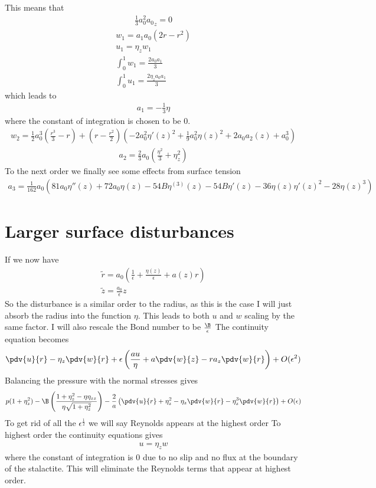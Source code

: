 \documentclass[12pt]{article}
\newcommand{\rt}{^{\frac{1}{2}}}
\begin{document}
This means that 
\begin{align}
\frac{1}{3}a_0^2{a_0}_z = 0
\end{align}
\begin{align}
w_1 = a_1 a_0 (2r - r^2) \\
u_1 = \eta_z w_1\\
\int_0^1 w_1 = \frac{2a_0 a_1}{3}\\
\int_0^1 u_1 = \frac{2\eta_za_0 a_1}{3}
\end{align}
which leads to 
\begin{align}
a_1 = -\frac{1}{3}\eta
\end{align}
where the constant of integration is chosen to be 0.
\begin{align}
w_2 = \frac{1}{2} a_0^3 \left(\frac{r^3}{3}-r\right)+\left(r-\frac{r^2}{2}\right) \left(-2
a_0^2 \eta '(z)^2+\frac{1}{9} a_0^2 \eta (z)^2+2 a_0 a_2(z)+a_0^3\right)
\end{align}
\begin{align}
a_2 = \frac{2}{3}a_0\left(\frac{\eta^2}{3}+\eta_z^2\right)\end{align}
 To the next order we finally see some effects from surface tension
 \begin{align}
 a_3 = \frac{1}{162} a_0 \left(81 a_0 \eta ''(z)+72 a_0 \eta (z)-54 B \eta
 ^{(3)}(z)-54 B \eta '(z)-36 \eta (z) \eta '(z)^2-28 \eta (z)^3\right)
 \end{align}
\section{Larger surface disturbances}
If we now have
\begin{align}
\tilde{r} = a_0\left(\frac{1}{\epsilon}+\frac{\eta(z)}{\epsilon}+a(z) r\right)\\
\tilde{z} = \frac{a_0}{\epsilon}z
\end{align}
So the disturbance is a similar order to the radius, as this is the case I will just absorb the radius into the function $\eta$. This leads to both $u$ and $w$ scaling by the same factor. I will also rescale the Bond number to be $\frac{\B}{\epsilon}$ The continuity equation becomes 
\begin{align}
\pdv{u}{r}-\eta_z\pdv{w}{r}+\epsilon\left(\frac{au}{\eta}+a\pdv{w}{z}-ra_z\pdv{w}{r}\right)+ O(\epsilon^2)
\end{align}
Balancing the pressure with the normal stresses gives
\begin{align}
p(1+\eta_z^2)-\B\left(\frac{1+\eta_z^2-\eta\eta_{zz}}{\eta\sqrt{1+\eta_z^2}}\right)-\frac{2}{a}\left(\pdv{u}{r}+\eta_z^2-\eta_z\pdv{w}{r}-\eta_z^3\pdv{w}{r}\right)+O(\epsilon)
\end{align}
To get rid of all the $\epsilon\rt$ we will say Reynolds appears at the highest order
To highest order the continuity equations gives 
\begin{align}
u = \eta_z w
\end{align}
where the constant of integration is 0 due to no slip and no flux at the boundary of the stalactite. This will eliminate the Reynolds terms that appear at highest order.
\end{document}

